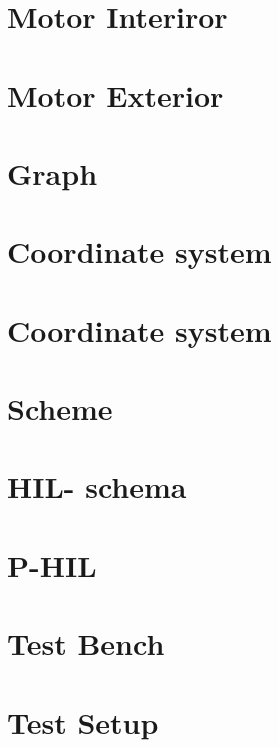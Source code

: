\documentclass{article}
\begin{document}
\section{Motor Interiror}



\section{Motor Exterior}



\section{Graph}



\section{Coordinate system}


\section{Coordinate system}



\section{Scheme}



\section{HIL- schema}



\section{P-HIL}



\section{Test Bench}



\section{Test Setup}

\end{document}
